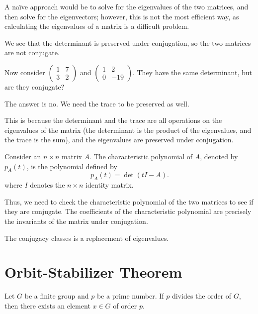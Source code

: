 \begin{example}
    A na\"ive approach would be to solve for the eigenvalues of the two matrices, and then solve for the eigenvectors; however, this is not the most efficient way, as calculating the eigenvalues of a matrix is a difficult problem.

    We see that the determinant is preserved under conjugation, so the two matrices are not conjugate.

    Now consider $\begin{pmatrix} 1 & 7 \\ 3 & 2 \end{pmatrix}$ and $\begin{pmatrix} 1 & 2 \\ 0 & -19 \end{pmatrix}$. They have the same determinant, but are they conjugate?

    The answer is no. We need the trace to be preserved as well.

    This is because the determinant and the trace are all operations on the eigenvalues of the matrix (the determinant is the product of the eigenvalues, and the trace is the sum), and the eigenvalues are preserved under conjugation.

    \begin{remark}
        Consider an $n \times n$ matrix $A$. The characteristic polynomial of $A$, denoted by $p_A(t)$, is the polynomial defined by \[
            p_A(t) = \det{(tI - A)}.
        \] where $I$ denotes the $n \times n$ identity matrix.
    \end{remark}

    Thus, we need to check the characteristic polynomial of the two matrices to see if they are conjugate. The coefficients of the characteristic polynomial are precisely the invariants of the matrix under conjugation.

    The conjugacy classes is a replacement of eigenvalues. 
\end{example}

\section{Orbit-Stabilizer Theorem}

\begin{theorem}\label{thm:cauchy}
    Let $G$ be a finite group and $p$ be a prime number. If $p$ divides the order of $G$, then there exists an element $x \in G$ of order $p$.
\end{theorem}

